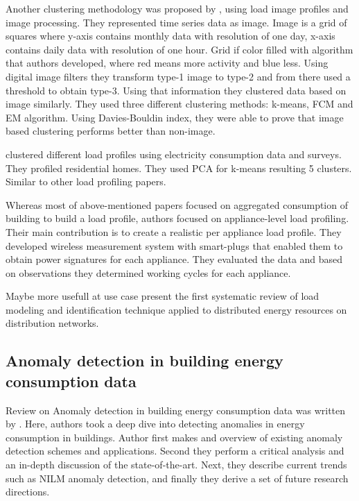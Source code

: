 \documentclass[
11pt, %
english, %
singlespacing, %
headsepline, %
]{MastersDoctoralThesis} %
\begin{document}
Another clustering methodology was proposed by \cite{Park2019}, using load image profiles and image processing.
They represented time series data as image. Image is a grid of squares where y-axis contains monthly data with resolution of one day,
x-axis contains daily data with resolution of one hour. Grid if color filled with algorithm that authors developed,
where red means more activity and blue less. Using digital image filters they transform type-1 image to type-2 and from there
used a threshold to obtain type-3. Using that information they clustered data based on image similarly. They used three different 
clustering methods: k-means, FCM and EM algorithm. Using Davies-Bouldin index, they were able to prove that image based clustering performs better than non-image.

\cite{Joana2012} clustered different load profiles using electricity consumption data and surveys. They profiled residential homes. 
They used PCA for k-means resulting 5 clusters. Similar to other load profiling papers. 

Whereas most of above-mentioned papers focused on aggregated consumption of building to build a load profile, authors \cite{Issi2018}
focused on appliance-level load profiling. Their main contribution is to create a realistic per appliance load profile.
They developed wireless measurement system with smart-plugs that enabled them to obtain 
power signatures for each appliance. They evaluated the data and based on observations they determined working cycles for each appliance.


Maybe more usefull at use case 
\cite{MORENOJARAMILLO2021445} present the first systematic review of load modeling and identification technique applied to
distributed energy resources on distribution networks.


\subsection{Anomaly detection in building energy consumption data}

Review on Anomaly detection in building energy consumption data was written by \cite{HIMEUR2021116601}.
Here, authors took a deep dive into detecting anomalies in energy consumption in buildings. 
Author first makes and overview of existing anomaly detection schemes and applications.
Second they perform a critical analysis and an in-depth discussion of the state-of-the-art.
Next, they describe current trends such as NILM anomaly detection, and finally they derive a set of future research directions. 
\end{document}
